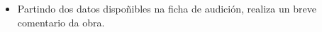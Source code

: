 \begin{ejercicio}[]
\begin{itemize}
    \item
    Partindo dos datos dispoñibles na ficha de audición, realiza un breve comentario da obra.
    \vspace*{14cm}
	\end{itemize}
\end{ejercicio}
%
